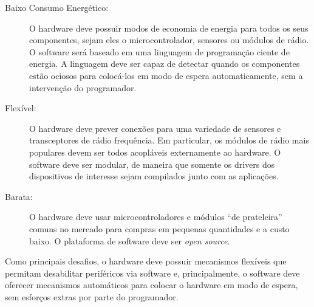 \documentclass[titlepage,12pt]{article}
\begin{document}
\begin{description}
%
\item[Baixo Consumo Energético:]
  O hardware deve possuir modos de economia de energia para todos os seus
  componentes, sejam eles o microcontrolador, sensores ou módulos de rádio.
  O software será baseado em uma linguagem de programação ciente de energia.
  A linguagem deve ser capaz de detectar quando os componentes estão ociosos
  para colocá-los em modo de espera automaticamente, sem a intervenção do
  programador.
%
\item[Flexível:]
  O hardware deve prever conexões para uma variedade de sensores e
  transceptores de rádio frequência.
  Em particular, os módulos de rádio mais populares devem ser todos acopláveis
  externamente ao hardware.
  O software deve ser modular, de maneira que somente os drivers dos
  dispositivos de interesse sejam compilados junto com as aplicações.
%
\item[Barata:]
  O hardware deve usar microcontroladores e módulos ``de prateleira'' comuns no
  mercado para compras em pequenas quantidades e a custo baixo.
  O plataforma de software deve ser \emph{open source}.
%
\end{description}

Como principais desafios, o hardware deve possuir mecanismos flexíveis que
permitam desabilitar periféricos via software e, principalmente, o software
deve oferecer mecanismos automáticos para colocar o hardware em modo de espera,
sem esforços extras por parte do programador.
\end{document}
